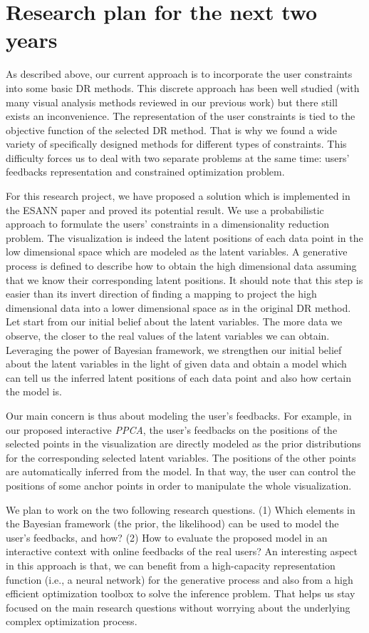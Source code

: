 \documentclass[11pt, a4paper]{article}
\begin{document}
\section{Research plan for the next two years}\label{sec:work}
As described above, our current approach is to incorporate the user constraints into some basic DR methods.
This discrete approach has been well studied (with many visual analysis methods reviewed in our previous work) but there still exists an inconvenience.
The representation of the user constraints is tied to the objective function of the selected DR method.
That is why we found a wide variety of specifically designed methods for different types of constraints.
This difficulty forces us to deal with two separate problems at the same time: users' feedbacks representation and constrained optimization problem.

For this research project, we have proposed a solution which is implemented in the ESANN paper and proved its potential result.
We use a probabilistic approach to formulate the users' constraints in a dimensionality reduction problem.
The visualization is indeed the latent positions of each data point in the low dimensional space which are modeled as the latent variables.
A generative process is defined to describe how to obtain the high dimensional data assuming that we know their corresponding latent positions.
It should note that this step is easier than its invert direction of finding a mapping to project the high dimensional data into a lower dimensional space as in the original DR method.
Let start from our initial belief about the latent variables.
The more data we observe, the closer to the real values of the latent variables we can obtain.
Leveraging the power of Bayesian framework, we strengthen our initial belief about the latent variables in the light of given data and obtain a model which can tell us the inferred latent positions of each data point and also how certain the model is.

Our main concern is thus about modeling the user's feedbacks.
For example, in our proposed interactive \emph{PPCA}, the user's feedbacks on the positions of the selected points in the visualization are directly modeled as the prior distributions for the corresponding selected latent variables.
The positions of the other points are automatically inferred from the model.
In that way, the user can control the positions of some anchor points in order to manipulate the whole visualization.

We plan to work on the two following research questions.
(1) Which elements in the Bayesian framework (the prior, the likelihood) can be used to model the user's feedbacks, and how?
(2) How to evaluate the proposed model in an interactive context with online feedbacks of the real users?
An interesting aspect in this approach is that, we can benefit from a high-capacity representation function (i.e., a neural network) for the generative process and also from a high efficient optimization toolbox to solve the inference problem.
That helps us stay focused on the main research questions without worrying about the underlying complex optimization process.
\end{document}
